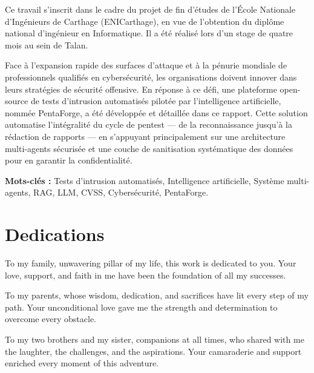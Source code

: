 \documentclass[12pt,a4paper]{report}
\begin{document}
Ce travail s'inscrit dans le cadre du projet de fin d'\'{e}tudes de l'\'{E}cole Nationale
d'Ing\'{e}nieurs de Carthage (ENICarthage), en vue de l'obtention du dipl\^{o}me national
d'ing\'{e}nieur en Informatique. Il a \'{e}t\'{e} r\'{e}alis\'{e} lors d'un stage de quatre mois au sein de Talan.

Face à l'expansion rapide des surfaces d'attaque et à la pénurie mondiale de professionnels qualifiés en cybersécurité, les organisations doivent innover dans leurs stratégies de sécurité offensive. En réponse à ce défi, une plateforme open-source de tests d'intrusion automatisés pilotée par l'intelligence artificielle, nommée PentaForge, a été développée et détaillée dans ce rapport. Cette solution automatise l'intégralité du cycle de pentest — de la reconnaissance jusqu'à la rédaction de rapports — en s'appuyant principalement sur une architecture multi-agents sécurisée et une couche de sanitisation systématique des données pour en garantir la confidentialité.

\vspace{0.4cm}
\noindent \textbf{Mots-cl\'{e}s :} Tests d'intrusion automatis\'{e}s, Intelligence artificielle,
Syst\`{e}me multi-agents, RAG, LLM, CVSS, Cybers\'{e}curit\'{e}, PentaForge.

\newpage
\thispagestyle{fancy}
\section*{Dedications}

\vspace{1.2cm}

To my family, unwavering pillar of my life, this work is dedicated to you.
Your love, support, and faith in me have been the foundation of all my successes.

\vspace{1cm}

To my parents, whose wisdom, dedication, and sacrifices have lit every step of my path.
Your unconditional love gave me the strength and determination to overcome every obstacle.

\vspace{1cm}

To my two brothers and my sister, companions at all times, who shared with me
the laughter, the challenges, and the aspirations. Your camaraderie and support
enriched every moment of this adventure.

\vspace{1cm}
\end{document}

